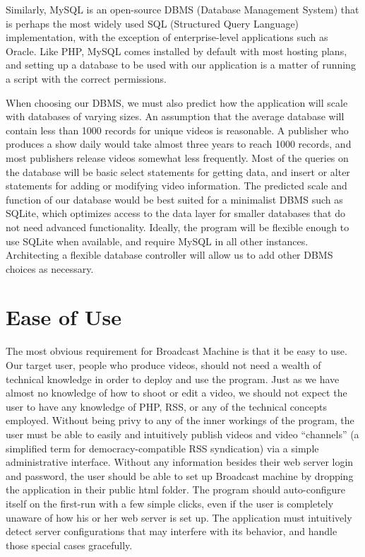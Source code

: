 \documentclass[a4paper,12pt]{report}
\begin{document}
Similarly, MySQL is an open-source DBMS (Database Management System) that is perhaps the most widely used SQL (Structured Query Language) implementation, with the exception of enterprise-level applications such as Oracle. 
Like PHP, MySQL comes installed by default with most hosting plans, and setting up a database to be used with our application is a matter of running a script with the correct permissions. 

When choosing our DBMS, we must also predict how the application will scale with databases of varying sizes. 
An assumption that the average database will contain less than 1000 records for unique videos is reasonable. A publisher who produces a show daily would take almost three years to reach 1000 records, and most publishers release videos somewhat less frequently. 
Most of the queries on the database will be basic select statements for getting data, and insert or alter statements for adding or modifying video information. 
The predicted scale and function of our database would be best suited for a minimalist DBMS such as SQLite, which optimizes access to the data layer for smaller databases that do not need advanced functionality. 
Ideally, the program will be flexible enough to use SQLite when available, and require MySQL in all other instances. 
Architecting a flexible database controller will allow us to add other DBMS choices as necessary.

\section{Ease of Use}

	The most obvious requirement for Broadcast Machine is that it be easy to use. 
Our target user, people who produce videos, should not need a wealth of technical knowledge in order to deploy and use the program. 
Just as we have almost no knowledge of how to shoot or edit a video, we should not expect the user to have any knowledge of PHP, RSS, or any of the technical concepts employed. 
Without being privy to any of the inner workings of the program, the user must be able to easily and intuitively publish videos and video “channels” (a simplified term for democracy-compatible RSS syndication) via a simple administrative interface. 
Without any information besides their web server login and password, the user should be able to set up Broadcast machine by dropping the application in their public html folder. 
The program should auto-configure itself on the first-run with a few simple clicks, even if the user is completely unaware of how his or her web server is set up. 
The application must intuitively detect server configurations that may interfere with its behavior, and handle those special cases gracefully.
\end{document}

